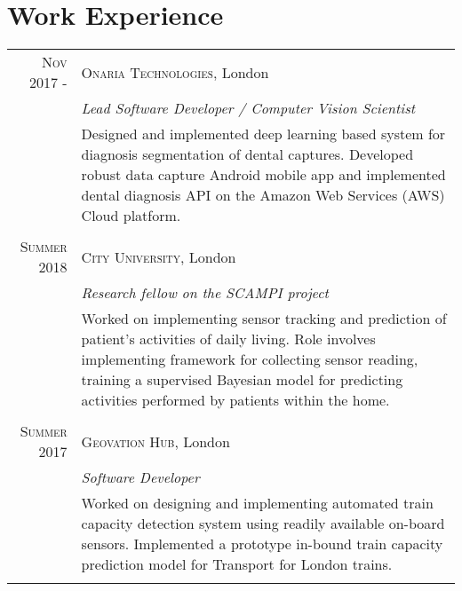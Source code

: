 \documentclass[letterpaper,11pt]{article}
\begin{document}
\section{Work Experience}
\setlength{\tabcolsep}{10pt}
\renewcommand{\arraystretch}{1}
\begin{tabular}{r|p{14cm}}

 
\textsc{Nov 2017 -} & \textsc{Onaria Technologies}, London \\
&\emph{Lead Software Developer / Computer Vision Scientist}\\
&\footnotesize{ Designed and implemented deep learning based system for diagnosis segmentation of dental captures. Developed robust data capture Android mobile app and implemented dental diagnosis API on the Amazon Web Services (AWS) Cloud platform.}\\\multicolumn{2}{c}{} \\

\textsc{Summer 2018} & \textsc{City University}, London \\
&\emph{Research fellow on the SCAMPI project}\\
&\footnotesize{Worked on implementing sensor tracking and prediction of patient's activities of daily living. Role involves implementing framework for collecting sensor reading, training a supervised Bayesian model for predicting activities performed by patients within the home.}\\\multicolumn{2}{c}{} \\

 
\textsc{Summer 2017} & \textsc{Geovation Hub}, London \\
&\emph{Software Developer}\\
&\footnotesize{Worked on designing and implementing automated train capacity detection system using readily available on-board sensors. Implemented a prototype in-bound train capacity prediction model for Transport for London trains.}\\\multicolumn{2}{c}{} \\


\end{tabular}
\end{document}
